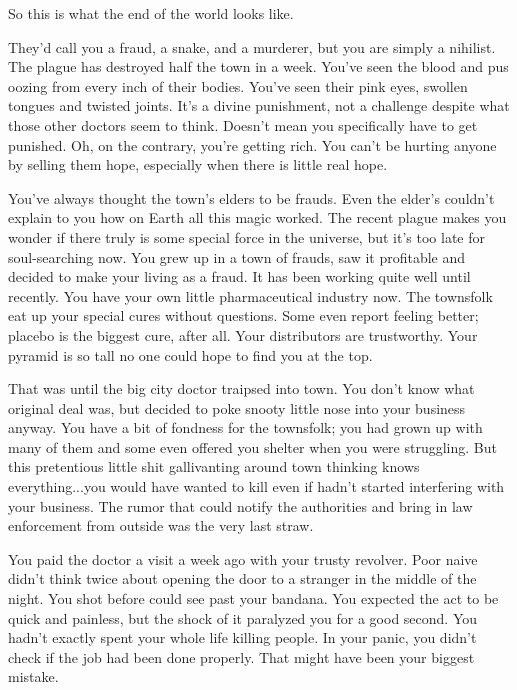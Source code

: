 \documentclass[char]{Pestilence}
\begin{document}
\name{\cCon{}}

So this is what the end of the world looks like.

They'd call you a fraud, a snake, and a murderer, but you are simply a nihilist. The plague has destroyed half the town in a week. You've seen the blood and pus oozing from every inch of their bodies. You've seen their pink eyes, swollen tongues and twisted joints. It's a divine punishment, not a challenge despite what those other doctors seem to think. Doesn't mean you specifically have to get punished. Oh, on the contrary, you're getting rich. You can't be hurting anyone by selling them hope, especially when there is little real hope.

You've always thought the town's elders to be frauds. Even the elder's \cApprentice{\offspring} couldn't explain to you how on Earth all this magic worked. The recent plague makes you wonder if there truly is some special force in the universe, but it's too late for soul-searching now. You grew up in a town of frauds, saw it profitable and decided to make your living as a fraud. It has been working quite well until recently. You have your own little pharmaceutical industry now. The townsfolk eat up your special cures without questions. Some even report feeling better; placebo is the biggest cure, after all. Your distributors are trustworthy. Your pyramid is so tall no one could hope to find you at the top.

That was until the big city doctor traipsed into town. You don't know what \cOutsider{\their} original deal was, but \cOutsider{\they} decided to poke \cOutsider{\their} snooty little nose into your business anyway. You have a bit of fondness for the townsfolk; you had grown up with many of them and some even offered you shelter when you were struggling. But this pretentious little shit gallivanting around town thinking \cOutsider{\they} knows everything...you would have wanted to kill \cOutsider{\them} even if \cOutsider{\they} hadn't started interfering with your business. The rumor that \cOutsider{\they} could notify the authorities and bring in law enforcement from outside was the very last straw.

You paid the doctor a visit a week ago with your trusty revolver. Poor naive \cOutsider{\human} didn't think twice about opening the door to a stranger in the middle of the night. You shot \cOutsider{\them} before \cOutsider{\they} could see past your bandana. You expected the act to be quick and painless, but the shock of it paralyzed you for a good second. You hadn't exactly spent your whole life killing people. In your panic, you didn't check if the job had been done properly. That might have been your biggest mistake.
\end{document}
